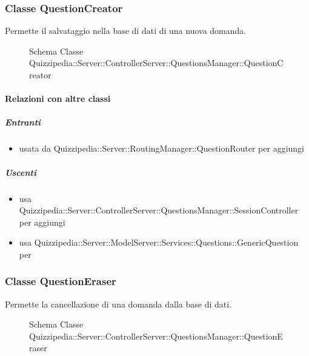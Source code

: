 \subsubsection{Classe QuestionCreator}
Permette il salvataggio nella base di dati di una nuova domanda.
\begin{figure}[H]
\centering
\noindent{}
\caption[Schema Classe QuestionCreator]{Schema Classe Quizzipedia::Server::ControllerServer::QuestionsManager::QuestionCreator}
\end{figure}
\paragraph{Relazioni con altre classi}
\subparagraph{Entranti}
\begin{itemize}
\item usata da Quizzipedia::Server::RoutingManager::QuestionRouter per aggiungi
\end{itemize}
\subparagraph{Uscenti}
\begin{itemize}
\item usa Quizzipedia::Server::ControllerServer::QuestionsManager::SessionController per aggiungi
\item usa Quizzipedia::Server::ModelServer::Services::Questions::GenericQuestion per 
\end{itemize}
\subsubsection{Classe QuestionEraser}
Permette la cancellazione di una domanda dalla base di dati.
\begin{figure}[H]
\centering
\noindent{}
\caption[Schema Classe QuestionEraser]{Schema Classe Quizzipedia::Server::ControllerServer::QuestionsManager::QuestionEraser}
\end{figure}
